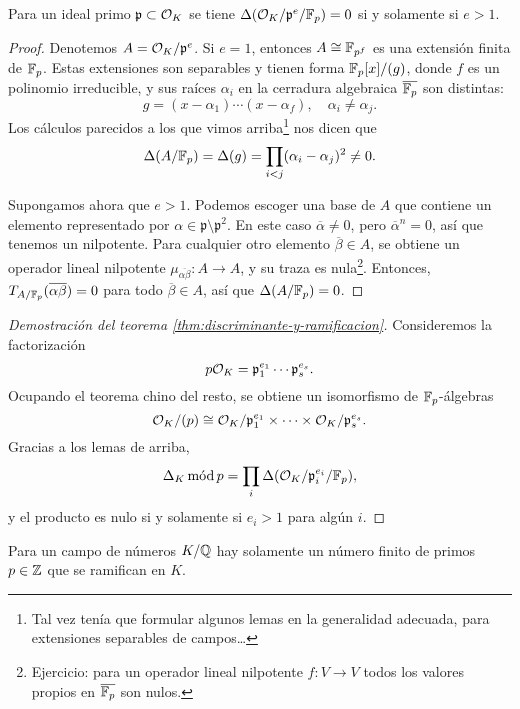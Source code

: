 \begin{lema}
  Para un ideal primo $\mathfrak{p} \subset \mathcal{O}_K$ se tiene
  $\Delta (\mathcal{O}_K/\mathfrak{p}^e/\mathbb{F}_p) = 0$ si y solamente si $e > 1$.

  \begin{proof}
    Denotemos $A = \mathcal{O}_K/\mathfrak{p}^e$.
    Si $e = 1$, entonces $A \cong \mathbb{F}_{p^f}$ es una extensión finita de
    $\mathbb{F}_p$. Estas extensiones son separables y tienen forma $\mathbb{F}_p [x]/(g)$,
    donde $f$ es un polinomio irreducible, y sus raíces $\alpha_i$ en la
    cerradura algebraica $\overline{\mathbb{F}_p}$ son distintas:
    $$g = (x - \alpha_1) \cdots (x - \alpha_f), \quad \alpha_i \ne \alpha_j.$$
    Los cálculos parecidos a los que vimos arriba\footnote{
      Tal vez tenía que formular algunos lemas en la generalidad adecuada,
      para extensiones separables de campos\dots} nos dicen que
    \[ \Delta (A/\mathbb{F}_p) = \Delta (g) =
       \prod_{i < j} (\alpha_i - \alpha_j)^2 \ne 0. \]

    Supongamos ahora que $e > 1$. Podemos escoger una base de $A$ que contiene
    un elemento representado por
    $\alpha \in \mathfrak{p}\setminus\mathfrak{p}^2$. En este caso
    $\overline{\alpha} \ne 0$, pero $\overline{\alpha}^n = 0$, así que tenemos
    un nilpotente. Para cualquier otro elemento $\overline{\beta} \in A$,
    se obtiene un operador lineal nilpotente
    $\mu_{\overline{\alpha\beta}}\colon A\to A$, y su traza es nula\footnote{
      Ejercicio: para un operador lineal nilpotente $f\colon V\to V$ todos los
      valores propios en $\overline{\mathbb{F}_p}$ son nulos.}. Entonces,
    $T_{A/\mathbb{F}_p} (\overline{\alpha\beta}) = 0$ para todo
    $\overline{\beta} \in A$, así que $\Delta (A/\mathbb{F}_p) = 0$.
  \end{proof}
\end{lema}

\begin{proof}[Demostración del teorema \ref{thm:discriminante-y-ramificacion}]
  Consideremos la factorización
  $$p\mathcal{O}_K = \mathfrak{p}_1^{e_1} \cdots \mathfrak{p}_s^{e_s}.$$
  Ocupando el teorema chino del resto, se obtiene un isomorfismo de
  $\mathbb{F}_p$-álgebras
  \[ \mathcal{O}_K/(p) \cong
     \mathcal{O}_K/\mathfrak{p}_1^{e_1}\times\cdots\times\mathcal{O}_K/\mathfrak{p}_s^{e_s}. \]
  Gracias a los lemas de arriba,
  \[ \Delta_K \operatorname{\text{mód}} p =
     \prod_i \Delta (\mathcal{O}_K/\mathfrak{p}_i^{e_i}/\mathbb{F}_p), \]
  y el producto es nulo si y solamente si $e_i > 1$ para algún $i$.
\end{proof}

\begin{corolario}
  Para un campo de números $K/\mathbb{Q}$ hay solamente un número finito de primos
  $p \in \mathbb{Z}$ que se ramifican en $K$.
\end{corolario}

